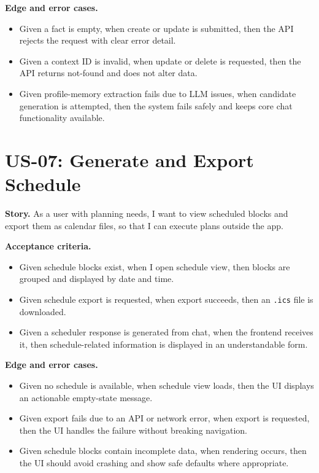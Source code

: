 \textbf{Edge and error cases.}
\begin{itemize}
  \item Given a fact is empty, when create or update is submitted, then the API rejects the request with clear error detail.
  \item Given a context ID is invalid, when update or delete is requested, then the API returns not-found and does not alter data.
  \item Given profile-memory extraction fails due to LLM issues, when candidate generation is attempted, then the system fails safely and keeps core chat functionality available.
\end{itemize}

\section{US-07: Generate and Export Schedule}

\textbf{Story.} As a user with planning needs, I want to view scheduled blocks and export them as calendar files, so that I can execute plans outside the app.

\textbf{Acceptance criteria.}
\begin{itemize}
  \item Given schedule blocks exist, when I open schedule view, then blocks are grouped and displayed by date and time.
  \item Given schedule export is requested, when export succeeds, then an \texttt{.ics} file is downloaded.
  \item Given a scheduler response is generated from chat, when the frontend receives it, then schedule-related information is displayed in an understandable form.
\end{itemize}

\textbf{Edge and error cases.}
\begin{itemize}
  \item Given no schedule is available, when schedule view loads, then the UI displays an actionable empty-state message.
  \item Given export fails due to an API or network error, when export is requested, then the UI handles the failure without breaking navigation.
  \item Given schedule blocks contain incomplete data, when rendering occurs, then the UI should avoid crashing and show safe defaults where appropriate.
\end{itemize}

